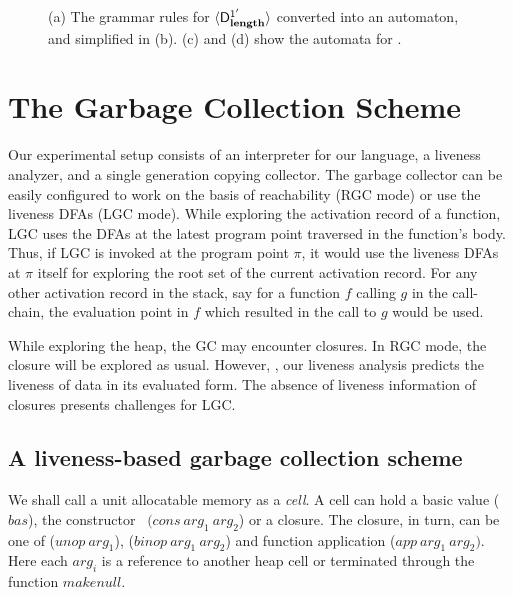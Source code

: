\documentclass[9pt]{sigplanconf}
\newcommand{\cred}[1]{{\color{red}{#1}}}
\begin{document}
\begin{figure}[t!]
\caption{(a) The grammar rules for $\langle \mathsf{D}_{\mathit {\mathbf{length}}}^{1'}\rangle$
converted into
  an automaton, and simplified in   (b). (c) and (d) show the automata
  for   .}\label{fig:example-automata}
\figrule
\end{figure}


\section{The Garbage Collection Scheme}

Our experimental setup consists of  an interpreter for our language, a
liveness  analyzer, and  a single  generation copying  collector.  The
garbage collector  can be  easily configured to  work on the  basis of
reachability (RGC  mode) or use  the liveness DFAs (LGC  mode).  While
exploring the  activation record of a  function, LGC uses  the DFAs at
the latest program  point traversed in the function's  body.  Thus, if
LGC is invoked  at the program point $\pi$, it  would use the liveness
DFAs  at  $\pi$ itself  for  exploring the  root  set  of the  current
activation record. For  any other activation record in  the stack, say
for a function ${\mathit f}$  calling ${\mathit g}$ in the call-chain,
the evaluation  point in ${\mathit f}$  which resulted in  the call to
${\mathit g}$ would be used.

While exploring the heap, the  GC may encounter closures. In RGC mode,
the  closure will  be explored  as  usual. However,  \cred{  as
  mentioned earlier}, our liveness analysis predicts the liveness of
data in its evaluated form. The absence of liveness information of
closures presents challenges for LGC.


\subsection{A liveness-based garbage collection scheme}
We shall call  a unit allocatable memory as a {\em  cell}.  A cell can
hold  a  basic  value   ($\mathit{bas}$),  the  constructor  \CONS\  $(\mathit{cons~
arg_1~arg_2}$) or   a closure.  The closure, in  turn, can be  one of
($\mathit{unop~arg_1}$),  ($\mathit{ binop~arg_1~arg_2}$)  and  function  application
($\mathit{app~arg_1~arg_2})$.  Here each $\mathit{ arg_i}$ is a reference to another heap
cell or terminated through the function $\mathit{makenull}$. 
\end{document}

